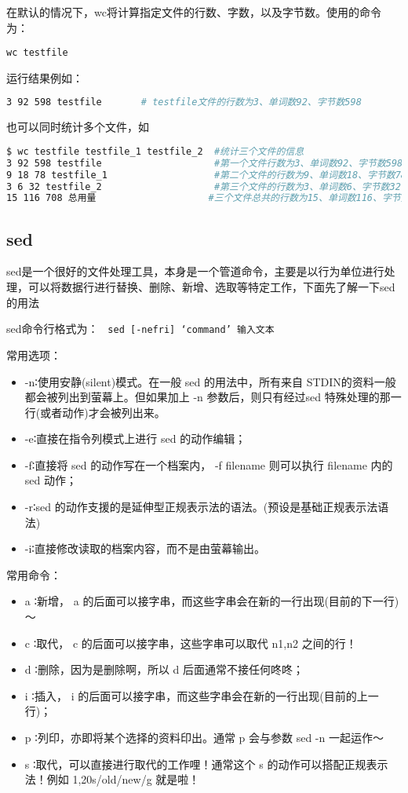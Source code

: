 在默认的情况下，wc将计算指定文件的行数、字数，以及字节数。使用的命令为：

\verb|wc testfile|

运行结果例如：

\begin{lstlisting}[language=sh]
3 92 598 testfile       # testfile文件的行数为3、单词数92、字节数598 
\end{lstlisting}

也可以同时统计多个文件，如
\begin{lstlisting}[language=sh]
$ wc testfile testfile_1 testfile_2  #统计三个文件的信息  
3 92 598 testfile                    #第一个文件行数为3、单词数92、字节数598  
9 18 78 testfile_1                   #第二个文件的行数为9、单词数18、字节数78  
3 6 32 testfile_2                    #第三个文件的行数为3、单词数6、字节数32  
15 116 708 总用量                    #三个文件总共的行数为15、单词数116、字节数708 
\end{lstlisting}



\subsection{sed}
sed是一个很好的文件处理工具，本身是一个管道命令，主要是以行为单位进行处理，可以将数据行进行替换、删除、新增、选取等特定工作，下面先了解一下sed的用法

sed命令行格式为： \verb| sed [-nefri] ‘command’ 输入文本 |      

常用选项：
\begin{itemize}
\item  -n∶使用安静(silent)模式。在一般 sed 的用法中，所有来自 STDIN的资料一般都会被列出到萤幕上。但如果加上 -n 参数后，则只有经过sed 特殊处理的那一行(或者动作)才会被列出来。
\item  -e∶直接在指令列模式上进行 sed 的动作编辑；
\item  -f∶直接将 sed 的动作写在一个档案内， -f filename 则可以执行 filename 内的sed 动作；
\item  -r∶sed 的动作支援的是延伸型正规表示法的语法。(预设是基础正规表示法语法)
\item  -i∶直接修改读取的档案内容，而不是由萤幕输出。       
\end{itemize}

常用命令：
\begin{itemize}
\item  a   ∶新增， a 的后面可以接字串，而这些字串会在新的一行出现(目前的下一行)～
\item c   ∶取代， c 的后面可以接字串，这些字串可以取代 n1,n2 之间的行！
\item        d   ∶删除，因为是删除啊，所以 d 后面通常不接任何咚咚；
\item         i   ∶插入， i 的后面可以接字串，而这些字串会在新的一行出现(目前的上一行)；
\item         p  ∶列印，亦即将某个选择的资料印出。通常 p 会与参数 sed -n 一起运作～
\item          s  ∶取代，可以直接进行取代的工作哩！通常这个 s 的动作可以搭配正规表示法！例如 1,20s/old/new/g 就是啦！
\end{itemize}

